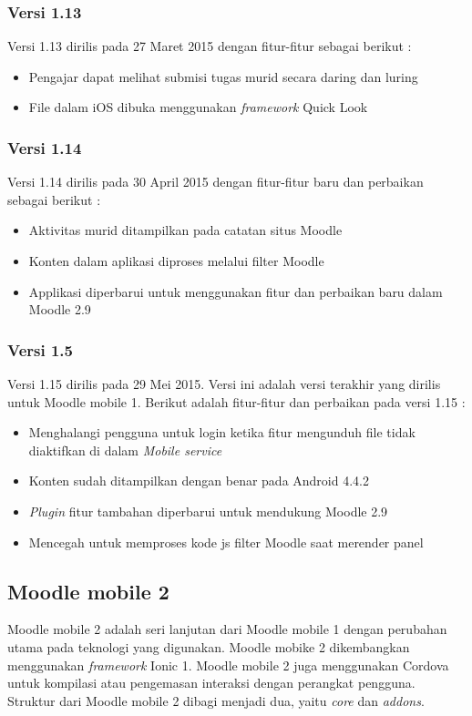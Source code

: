 \subsubsection{Versi 1.13}
Versi 1.13 dirilis pada 27 Maret 2015 dengan fitur-fitur sebagai berikut : \cite{moodle:dev}
	\begin{itemize}
		\item Pengajar dapat melihat submisi tugas murid secara daring dan luring
		\item File dalam iOS dibuka menggunakan \textit{framework} Quick Look
	\end{itemize}

\subsubsection{Versi 1.14}
Versi 1.14 dirilis pada 30 April 2015 dengan fitur-fitur baru dan perbaikan sebagai berikut : \cite{moodle:dev}
	\begin{itemize}
		\item Aktivitas murid ditampilkan pada catatan situs Moodle
		\item Konten dalam aplikasi diproses melalui filter Moodle
		\item Applikasi diperbarui untuk menggunakan fitur dan perbaikan baru dalam Moodle 2.9 
	\end{itemize}

\subsubsection{Versi 1.5}
Versi 1.15 dirilis pada 29 Mei 2015. Versi ini adalah versi terakhir yang dirilis untuk Moodle mobile 1. Berikut adalah fitur-fitur dan perbaikan pada versi 1.15 : \cite{moodle:dev}
	\begin{itemize}
		\item Menghalangi pengguna untuk login ketika fitur mengunduh file tidak diaktifkan di dalam \textit{Mobile service}
		\item Konten sudah ditampilkan dengan benar pada Android 4.4.2
		\item \textit{Plugin} fitur tambahan diperbarui untuk mendukung Moodle 2.9
		\item Mencegah untuk memproses kode js filter Moodle saat merender panel
	\end{itemize}

\subsection{Moodle mobile 2}
Moodle mobile 2 adalah seri lanjutan dari Moodle mobile 1 dengan perubahan utama pada teknologi yang digunakan. Moodle mobike 2 dikembangkan menggunakan \textit{framework} Ionic 1. Moodle mobile 2 juga menggunakan Cordova untuk kompilasi atau pengemasan interaksi dengan perangkat pengguna. Struktur dari Moodle mobile 2 dibagi menjadi dua, yaitu \textit{core} dan \textit{addons}. 

